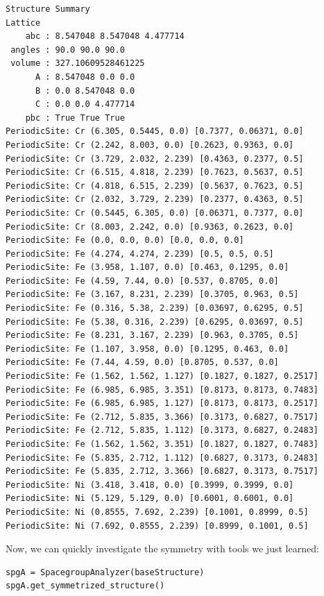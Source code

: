 \begin{verbatim}
Structure Summary
Lattice
    abc : 8.547048 8.547048 4.477714
 angles : 90.0 90.0 90.0
 volume : 327.10609528461225
      A : 8.547048 0.0 0.0
      B : 0.0 8.547048 0.0
      C : 0.0 0.0 4.477714
    pbc : True True True
PeriodicSite: Cr (6.305, 0.5445, 0.0) [0.7377, 0.06371, 0.0]
PeriodicSite: Cr (2.242, 8.003, 0.0) [0.2623, 0.9363, 0.0]
PeriodicSite: Cr (3.729, 2.032, 2.239) [0.4363, 0.2377, 0.5]
PeriodicSite: Cr (6.515, 4.818, 2.239) [0.7623, 0.5637, 0.5]
PeriodicSite: Cr (4.818, 6.515, 2.239) [0.5637, 0.7623, 0.5]
PeriodicSite: Cr (2.032, 3.729, 2.239) [0.2377, 0.4363, 0.5]
PeriodicSite: Cr (0.5445, 6.305, 0.0) [0.06371, 0.7377, 0.0]
PeriodicSite: Cr (8.003, 2.242, 0.0) [0.9363, 0.2623, 0.0]
PeriodicSite: Fe (0.0, 0.0, 0.0) [0.0, 0.0, 0.0]
PeriodicSite: Fe (4.274, 4.274, 2.239) [0.5, 0.5, 0.5]
PeriodicSite: Fe (3.958, 1.107, 0.0) [0.463, 0.1295, 0.0]
PeriodicSite: Fe (4.59, 7.44, 0.0) [0.537, 0.8705, 0.0]
PeriodicSite: Fe (3.167, 8.231, 2.239) [0.3705, 0.963, 0.5]
PeriodicSite: Fe (0.316, 5.38, 2.239) [0.03697, 0.6295, 0.5]
PeriodicSite: Fe (5.38, 0.316, 2.239) [0.6295, 0.03697, 0.5]
PeriodicSite: Fe (8.231, 3.167, 2.239) [0.963, 0.3705, 0.5]
PeriodicSite: Fe (1.107, 3.958, 0.0) [0.1295, 0.463, 0.0]
PeriodicSite: Fe (7.44, 4.59, 0.0) [0.8705, 0.537, 0.0]
PeriodicSite: Fe (1.562, 1.562, 1.127) [0.1827, 0.1827, 0.2517]
PeriodicSite: Fe (6.985, 6.985, 3.351) [0.8173, 0.8173, 0.7483]
PeriodicSite: Fe (6.985, 6.985, 1.127) [0.8173, 0.8173, 0.2517]
PeriodicSite: Fe (2.712, 5.835, 3.366) [0.3173, 0.6827, 0.7517]
PeriodicSite: Fe (2.712, 5.835, 1.112) [0.3173, 0.6827, 0.2483]
PeriodicSite: Fe (1.562, 1.562, 3.351) [0.1827, 0.1827, 0.7483]
PeriodicSite: Fe (5.835, 2.712, 1.112) [0.6827, 0.3173, 0.2483]
PeriodicSite: Fe (5.835, 2.712, 3.366) [0.6827, 0.3173, 0.7517]
PeriodicSite: Ni (3.418, 3.418, 0.0) [0.3999, 0.3999, 0.0]
PeriodicSite: Ni (5.129, 5.129, 0.0) [0.6001, 0.6001, 0.0]
PeriodicSite: Ni (0.8555, 7.692, 2.239) [0.1001, 0.8999, 0.5]
PeriodicSite: Ni (7.692, 0.8555, 2.239) [0.8999, 0.1001, 0.5]
\end{verbatim}

Now, we can quickly investigate the symmetry with tools we just learned:

\begin{verbatim}
spgA = SpacegroupAnalyzer(baseStructure)
spgA.get_symmetrized_structure()
\end{verbatim}

